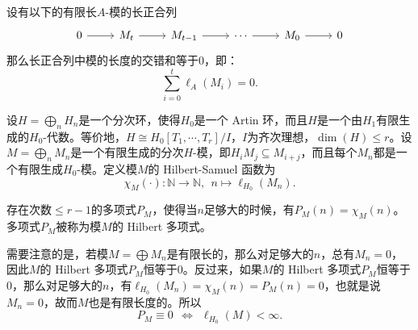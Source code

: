 \begin{lemma} 
设有以下的有限长$A$-模的长正合列
\begin{displaymath}
\begin{tikzcd}
0 \arrow[r] & M_t \arrow[r] & M_{t-1} \arrow[r] & \cdots \arrow[r] & M_0 \arrow[r] & 0
\end{tikzcd}
\end{displaymath}
那么长正合列中模的长度的交错和等于$0$，即：
\begin{equation}
\sum\limits_{i=0}^t \ell_A(M_i) = 0.
\end{equation}
\end{lemma}

设$H = \bigoplus\limits_n H_n$是一个分次环，使得$H_0$是一个 Artin 环，而且$H$是一个由$H_1$有限生成的$H_0$-代数。等价地，$H \cong H_0[T_1,\cdots,T_r] / I$，$I$为齐次理想，$\dim(H) \leqslant r$。设$M = \bigoplus\limits_n M_n$是一个有限生成的分次$H$-模，即$H_iM_j \subseteq M_{i+j}$，而且每个$M_n$都是一个有限生成$H_0$-模。定义模$M$的 Hilbert-Samuel 函数为
\begin{equation}
\chi_M(\cdot): \mathbb{N} \longrightarrow \mathbb{N}, ~~ n \mapsto \ell_{H_0}(M_n).
\end{equation}

\begin{theorem}
\label{hilbert polyn for modules}
存在次数$\leqslant r-1$的多项式$P_M$，使得当$n$足够大的时候，有$P_M(n) = \chi_M(n)$。多项式$P_M$被称为模$M$的 Hilbert 多项式。
\end{theorem}

需要注意的是，若模$M = \bigoplus M_n$是有限长的，那么对足够大的$n$，总有$M_n = 0$，因此$M$的 Hilbert 多项式$P_M$恒等于$0$。反过来，如果$M$的 Hilbert 多项式$P_M$恒等于$0$，那么对足够大的$n$，有$\ell_{H_0}(M_n) = \chi_M(n) = P_M(n) = 0$，也就是说$M_n = 0$，故而$M$也是有限长度的。所以
$$P_M\equiv 0 ~~ \Longleftrightarrow ~~ \ell_{H_0}(M) < \infty.$$

